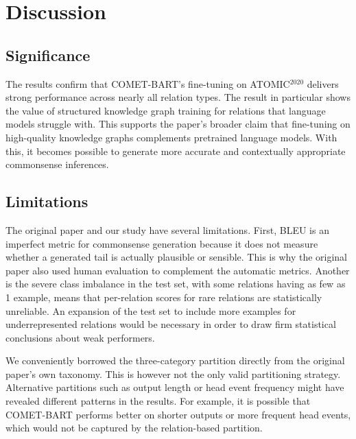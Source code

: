 \section{Discussion}
\label{sec:discussion}


\subsection{Significance}

The results confirm that COMET-BART's fine-tuning on ATOMIC$^{2020}$ delivers strong performance across nearly all relation types. The  result in particular shows the value of structured knowledge graph training for relations that language models struggle with. This supports the paper's broader claim that fine-tuning on high-quality knowledge graphs complements pretrained language models. With this, it becomes possible to generate more accurate and contextually appropriate commonsense inferences.


\subsection{Limitations}

The original paper and our study have several limitations. First, BLEU is an imperfect metric for commonsense generation because it does not measure whether a generated tail is actually plausible or sensible. This is why the original paper also used human evaluation to complement the automatic metrics. Another is the severe class imbalance in the test set, with some relations having as few as 1 example, means that per-relation scores for rare relations are statistically unreliable. An expansion of the test set to include more examples for underrepresented relations would be necessary in order to draw firm statistical conclusions about weak performers.



We conveniently borrowed the three-category partition directly from the original paper's own taxonomy. This is however not the only valid partitioning strategy. Alternative partitions such as output length or head event frequency might have revealed different patterns in the results. For example, it is possible that COMET-BART performs better on shorter outputs or more frequent head events, which would not be captured by the relation-based partition.

